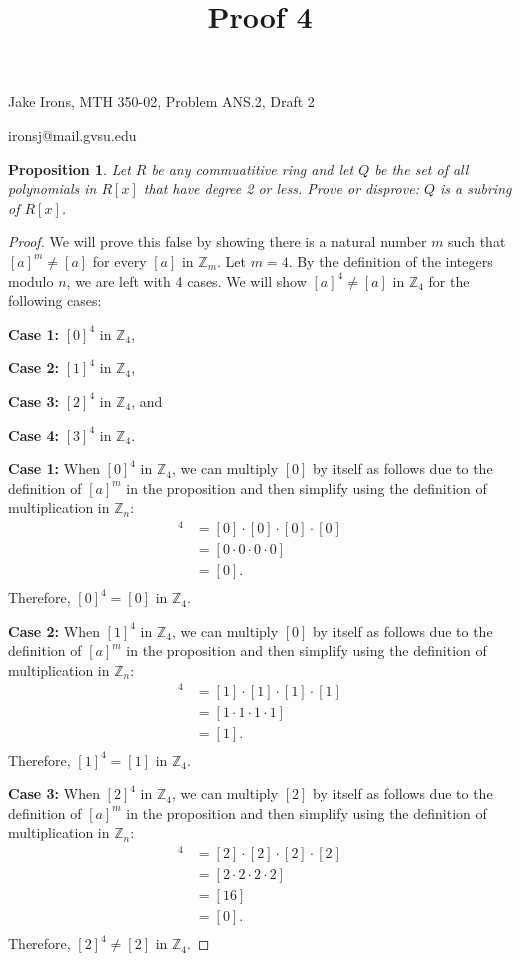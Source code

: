 \documentclass[11 pt]{article}
\title{Proof 4}
\newtheorem{proposition}{Proposition}
\newcommand{\newpar}{\vspace{.15in}\noindent}
\begin{document}
\noindent Jake Irons, MTH 350-02, Problem ANS.2, Draft 2

\noindent ironsj@mail.gvsu.edu

\newpar
\begin{proposition}
Let $R$ be any commuatitive ring and let $Q$ be the set of all polynomials in $R[x]$ that have degree 2 or less. Prove or disprove: $Q$ is a subring of $R[x]$.
\end{proposition}
\begin{proof}
\newpar 
We will prove this false by showing there is a natural number $m$ such that $[a]^m \not= [a]$ for every $[a]$ in $\mathbb{Z}_m$. Let $m=4$. By the definition of the integers modulo $n$, we are left with 4 cases. We will show $[a]^4 \not= [a]$ in $\mathbb{Z}_4$ for the following cases:

\textbf{Case 1:} $[0]^4$ in $\mathbb{Z}_4$,

\textbf{Case 2:} $[1]^4$ in $\mathbb{Z}_4$,

\textbf{Case 3:} $[2]^4$ in $\mathbb{Z}_4$, and

\textbf{Case 4:} $[3]^4$ in $\mathbb{Z}_4$.

\newpar
\textbf{Case 1:} When $[0]^4$ in $\mathbb{Z}_4$, we can multiply $[0]$ by itself as follows due to the definition of $[a]^m$ in the proposition and then simplify using the definition of multiplication in $\mathbb{Z}_n$:
\begin{align*}
[0]^4&=[0]\cdot[0]\cdot[0]\cdot[0] \\
&= [0\cdot 0\cdot 0\cdot 0] \\
&= [0]. \\
\end{align*}
\noindent
Therefore, $[0]^4=[0]$ in $\mathbb{Z}_4$.

\newpar
\textbf{Case 2:} When $[1]^4$ in $\mathbb{Z}_4$, we can multiply $[0]$ by itself as follows due to the definition of $[a]^m$ in the proposition and then simplify using the definition of multiplication in $\mathbb{Z}_n$:
\begin{align*}
[1]^4&=[1]\cdot[1]\cdot[1]\cdot[1] \\
&= [1\cdot 1\cdot 1\cdot 1] \\
&= [1]. \\
\end{align*}
\noindent
Therefore, $[1]^4=[1]$ in $\mathbb{Z}_4$.

\newpar
\textbf{Case 3:} When $[2]^4$ in $\mathbb{Z}_4$, we can multiply $[2]$ by itself as follows due to the definition of $[a]^m$ in the proposition and then simplify using the definition of multiplication in $\mathbb{Z}_n$:
\begin{align*}
[2]^4&=[2]\cdot[2]\cdot[2]\cdot[2] \\
&= [2\cdot 2\cdot 2\cdot 2] \\
&= [16] \\
&= [0]. \\
\end{align*}
\noindent
Therefore, $[2]^4\not=[2]$ in $\mathbb{Z}_4$.


\end{proof}
\end{document}
